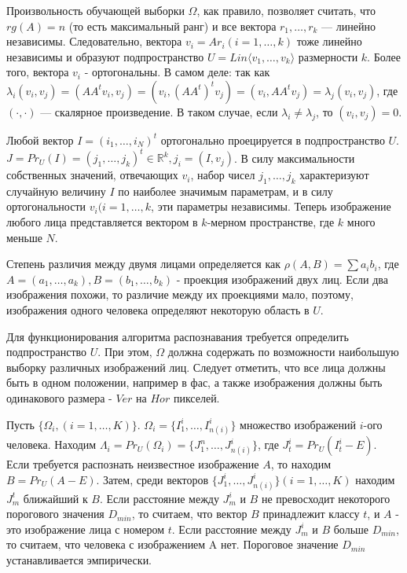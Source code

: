 Произвольность обучающей выборки $\Omega$, как правило, позволяет считать, что
$rg(A) = n$ (то есть максимальный ранг) и все вектора $r_1,\dots,r_k$ ---
линейно независимы. Следовательно, вектора $v_i = Ar_i (i = 1,\dots,k)$ тоже
линейно независимы и образуют подпространство $U = Lin\langle
v_1,\dots,v_k\rangle$ размерности $k$. Более того, вектора $v_i$ -
ортогональны. В самом деле: так как $\lambda_i(v_i,v_j) = (AA^tv_i,v_j) =
(v_i,(AA^t)^tv_j) = (v_i, AA^tv_j) = \lambda_j(v_i,v_j)$, где $(\cdot,\cdot)$
--- скалярное произведение. В таком случае, если $\lambda_i \neq \lambda_j$, то
$(v_i,v_j) = 0$.


Любой вектор $I = (i_1,\dots,i_N)^t$ ортогонально проецируется в подпространство
$U$. $J = Pr_U(I) = (j_1,\dots,j_k)^t \in \mathbb{R}^k, j_i = (I,v_j)$. В силу
максимальности собственных значений, отвечающих $v_i$, набор чисел
$j_1,\dots,j_k$ характеризуют случайную величину $I$ по наиболее значимым
параметрам, и в силу ортогональности $v_i (i=1,\dots,k$, эти параметры
независимы. Теперь изображение любого лица представляется вектором в $k$-мерном
пространстве, где $k$ много меньше $N$.


Степень различия между двумя лицами определяется как $\rho(A,B) = \sum a_ib_i$,
где $A = (a_1,\dots,a_k), B = (b_1,\dots,b_k)$ - проекция изображений двух
лиц. Если два изображения похожи, то различие между их проекциями мало, поэтому,
изображения одного человека определяют некоторую область в $U$.


Для функционирования алгоритма распознавания требуется определить
подпространство $U$. При этом, $\Omega$ должна содержать по возможности
наибольшую выборку различных изображений лиц. Следует отметить, что все лица
должны быть в одном положении, например в фас, а также изображения должны быть
одинакового размера - $Ver$ на $Hor$ пикселей.


Пусть $\{\Omega_i, (i=1,\dots,K)\}$. $\Omega_i = \{I_1^i,\dots,I_{n(i)}^i\}$
множество изображений $i$-ого человека. Находим $\Lambda_i = Pr_U(\Omega_i) =
\{J_1^n,\dots,J_{n(i)}^i\}$, где $J_t^i = Pr_U(I_t^i - E)$. Если требуется
распознать неизвестное изображение $A$, то находим $B = Pr_U(A - E)$. Затем,
среди векторов $\{J_1^i,\dots,J_{n(i)}^i\} (i=1,\dots,K)$ находим $J_m^t$
ближайший к $B$. Если расстояние между $J_m^i$ и $B$ не превосходит некоторого
порогового значения $D_{min}$, то считаем, что вектор $B$ принадлежит классу
$t$, и $A$ - это изображение лица с номером $t$. Если расстояние между $J_m^i$ и
$B$ больше $D_{min}$, то считаем, что человека с изображением A нет. Пороговое
значение $D_{min}$ устанавливается эмпирически.


